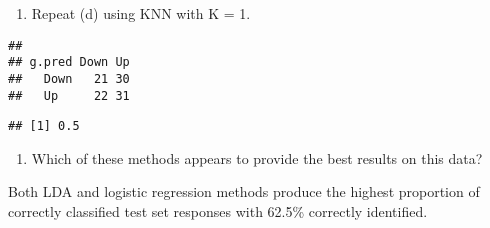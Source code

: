 \documentclass[]{article}
\newenvironment{Shaded}{\begin{snugshade}}{\end{snugshade}}
\newcommand{\DataTypeTok}[1]{\textcolor[rgb]{0.13,0.29,0.53}{#1}}
\newcommand{\DecValTok}[1]{\textcolor[rgb]{0.00,0.00,0.81}{#1}}
\newcommand{\KeywordTok}[1]{\textcolor[rgb]{0.13,0.29,0.53}{\textbf{#1}}}
\newcommand{\NormalTok}[1]{#1}
\newcommand{\OperatorTok}[1]{\textcolor[rgb]{0.81,0.36,0.00}{\textbf{#1}}}
\newcommand{\StringTok}[1]{\textcolor[rgb]{0.31,0.60,0.02}{#1}}
\providecommand{\tightlist}{%
  \setlength{\itemsep}{0pt}\setlength{\parskip}{0pt}}
\begin{document}
\begin{enumerate}
\def\labelenumi{(\alph{enumi})}
\setcounter{enumi}{6}
\tightlist
\item
  Repeat (d) using KNN with K = 1.
\end{enumerate}

\begin{Shaded}
\end{Shaded}

\begin{verbatim}
##       
## g.pred Down Up
##   Down   21 30
##   Up     22 31
\end{verbatim}

\begin{Shaded}
\end{Shaded}

\begin{verbatim}
## [1] 0.5
\end{verbatim}

\begin{enumerate}
\def\labelenumi{(\alph{enumi})}
\setcounter{enumi}{7}
\tightlist
\item
  Which of these methods appears to provide the best results on this
  data?
\end{enumerate}

Both LDA and logistic regression methods produce the highest proportion
of correctly classified test set responses with 62.5\% correctly
identified.
\end{document}
